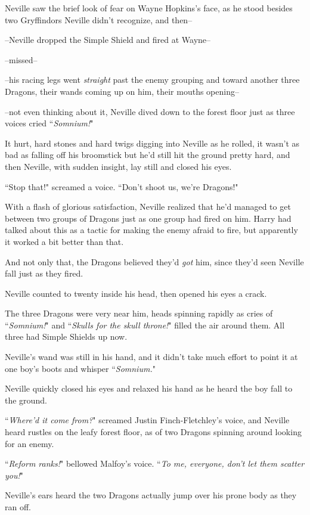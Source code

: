 Neville saw the brief look of fear on Wayne Hopkins's face, as he stood besides two Gryffindors Neville didn't recognize, and then\---

\---Neville dropped the Simple Shield and fired at Wayne\---

\---missed\---

\---his racing legs went \emph{straight} past the enemy grouping and toward another three Dragons, their wands coming up on him, their mouths opening\---

\---not even thinking about it, Neville dived down to the forest floor just as three voices cried ``\emph{Somnium!}"

It hurt, hard stones and hard twigs digging into Neville as he rolled, it wasn't as bad as falling off his broomstick but he'd still hit the ground pretty hard, and then Neville, with sudden insight, lay still and closed his eyes.

``Stop that!" screamed a voice. ``Don't shoot us, we're Dragons!"

With a flash of glorious satisfaction, Neville realized that he'd managed to get between two groups of Dragons just as one group had fired on him. Harry had talked about this as a tactic for making the enemy afraid to fire, but apparently it worked a bit better than that.

And not only that, the Dragons believed they'd \emph{got} him, since they'd seen Neville fall just as they fired.

Neville counted to twenty inside his head, then opened his eyes a crack.

The three Dragons were very near him, heads spinning rapidly as cries of ``\emph{Somnium!}" and ``\emph{Skulls for the skull throne!}" filled the air around them. All three had Simple Shields up now.

Neville's wand was still in his hand, and it didn't take much effort to point it at one boy's boots and whisper ``\emph{Somnium.}"

Neville quickly closed his eyes and relaxed his hand as he heard the boy fall to the ground.

``\emph{Where'd it come from?}" screamed Justin Finch-Fletchley's voice, and Neville heard rustles on the leafy forest floor, as of two Dragons spinning around looking for an enemy.

``\emph{Reform ranks!}" bellowed Malfoy's voice. ``\emph{To me, everyone, don't let them scatter you!}"

Neville's ears heard the two Dragons actually jump over his prone body as they ran off.

